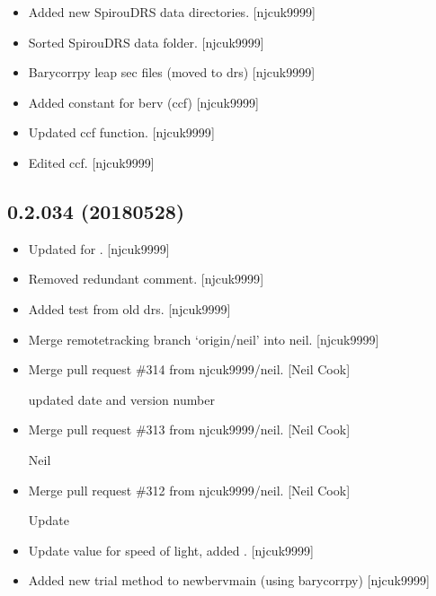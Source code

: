 \documentclass[a4paper,10pt,english]{report}
\begin{document}
\begin{itemize}
\item {} 
Added new SpirouDRS data directories. {[}njcuk9999{]}

\item {} 
Sorted SpirouDRS data folder. {[}njcuk9999{]}

\item {} 
Barycorrpy leap sec files (moved to drs) {[}njcuk9999{]}

\item {} 
Added constant for berv (ccf) {[}njcuk9999{]}

\item {} 
Updated ccf function. {[}njcuk9999{]}

\item {} 
Edited ccf. {[}njcuk9999{]}

\end{itemize}


\subsection{0.2.034 (2018\sphinxhyphen{}05\sphinxhyphen{}28)}
\label{\detokenize{misc/changelog:id448}}\begin{itemize}
\item {} 
Updated for . {[}njcuk9999{]}

\item {} 
Removed redundant comment. {[}njcuk9999{]}

\item {} 
Added test from old drs. {[}njcuk9999{]}

\item {} 
Merge remote\sphinxhyphen{}tracking branch ‘origin/neil’ into neil. {[}njcuk9999{]}

\item {} 
Merge pull request \#314 from njcuk9999/neil. {[}Neil Cook{]}

updated date and version number

\item {} 
Merge pull request \#313 from njcuk9999/neil. {[}Neil Cook{]}

Neil

\item {} 
Merge pull request \#312 from njcuk9999/neil. {[}Neil Cook{]}

Update 

\item {} 
Update value for speed of light, added .
{[}njcuk9999{]}

\item {} 
Added new trial method to newbervmain (using barycorrpy) {[}njcuk9999{]}

\end{itemize}
\end{document}
